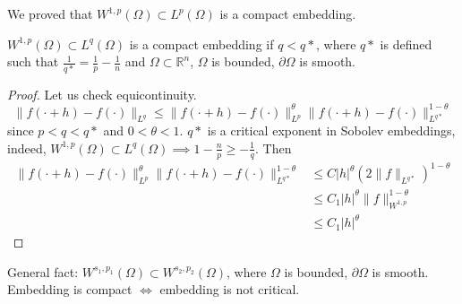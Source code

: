 \documentclass{report}
\begin{document}
\begin{note}
    We proved that \(W^{1, p}(\Omega) \subset L^{p}(\Omega)\) is a compact embedding.
\end{note}

\cor{}
{
    \(W^{1, p}(\Omega) \subset L^{q}(\Omega)\) is a compact embedding if \(q < q*\), where \(q*\) is defined such that \(\frac{1}{q*} = \frac{1}{p} - \frac{1}{n}\) and \(\Omega \subset  \mathbb{R}^{n}\), \(\Omega\) is bounded, \(\partial \Omega\) is smooth.
}

\begin{proof}
    Let us check equicontinuity. 
    \[
        \|f(\cdot + h) - f(\cdot)\|_{L^{q}} \leq \|f(\cdot + h) - f(\cdot)\|_{L^{p}}^{\theta} \|f(\cdot + h) - f(\cdot)\|_{L^{q*}}^{1-\theta} 
    \]
    since \(p < q < q*\) and \(0 < \theta < 1\). \(q*\) is a critical exponent in Sobolev embeddings, indeed, \(W^{1, p}(\Omega) \subset L^{q}(\Omega) \implies 1-\frac{n}{p} \geq -\frac{1}{q}\). Then
    \begin{align*}
        \|f(\cdot + h) - f(\cdot)\|_{L^{p}}^{\theta} \|f(\cdot + h) - f(\cdot)\|_{L^{q*}}^{1-\theta} &\leq C \vert h \vert ^{\theta}(2\|f\|_{L^{q*}})^{1-\theta} \\
        &\leq C_1 \vert h \vert ^{\theta} \|f\|_{W^{1, p}}^{1-\theta} \\
        &\leq C_1 \vert h \vert ^{\theta}
    \end{align*}
\end{proof}

\noindent
General fact: \(W^{s_1, p_1}(\Omega) \subset W^{s_2, p_2}(\Omega)\), where \(\Omega\) is bounded, \(\partial \Omega\) is smooth. Embedding is compact \(\iff\) embedding is not critical.
\end{document}
